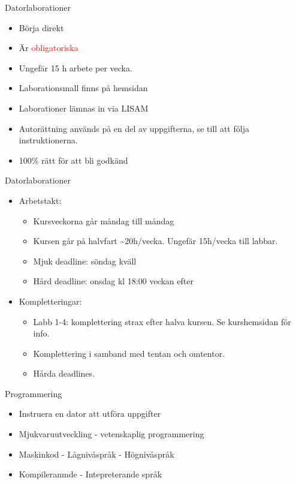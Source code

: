\documentclass[
  10pt,
  ignorenonframetext,
]{beamer}
\providecommand{\tightlist}{%
  \setlength{\itemsep}{0pt}\setlength{\parskip}{0pt}}
\begin{document}
\begin{frame}{Datorlaborationer}
\protect\hypertarget{datorlaborationer}{}
\begin{itemize}
\tightlist
\item
  Börja direkt
\item
  Är \textcolor{red}{obligatoriska}
\item
  Ungefär 15 h arbete per vecka.
\item
  Laborationsmall finns på hemsidan
\item
  Laborationer lämnas in via LISAM
\item
  Autorättning används på en del av uppgifterna, se till att följa
  instruktionerna.
\item
  100\% rätt för att bli godkänd
\end{itemize}
\end{frame}

\begin{frame}{Datorlaborationer}
\protect\hypertarget{datorlaborationer-1}{}
\begin{itemize}
\tightlist
\item
  Arbetstakt:

  \begin{itemize}
  \tightlist
  \item
    Kursveckorna går måndag till måndag
  \item
    Kursen går på halvfart \textasciitilde20h/vecka. Ungefär 15h/vecka
    till labbar.
  \item
    Mjuk deadline: söndag kväll
  \item
    Hård deadline: onsdag kl 18:00 veckan efter
  \end{itemize}
\item
  Kompletteringar:

  \begin{itemize}
  \tightlist
  \item
    Labb 1-4: komplettering strax efter halva kursen. Se kurshemsidan
    för info.
  \item
    Komplettering i samband med tentan och omtentor.
  \item
    Hårda deadlines.
  \end{itemize}
\end{itemize}
\end{frame}

\begin{frame}{Programmering}
\protect\hypertarget{programmering}{}
\begin{itemize}[<+->]
\tightlist
\item
  Instruera en dator att utföra uppgifter
\item
  Mjukvaruutveckling - vetenskaplig programmering
\item
  Maskinkod - Lågnivåspråk - Högnivåspråk
\item
  Kompileranmde - Intepreterande språk
\end{itemize}
\end{frame}
\end{document}
